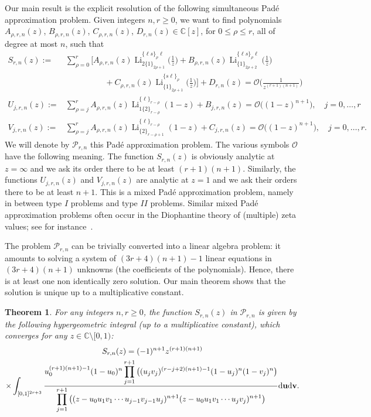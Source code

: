 \documentclass[reqno,12pt]{amsart}
\numberwithin{equation}{section}
\newtheorem{theo}{Theorem}
\theoremstyle{remark}
\def\li{\operatorname{Li}}
\def\dd{\textup{d}}
\begin{document}
 
Our main result is the explicit resolution of the following simultaneous Pad\'e approximation problem. 
Given   integers $n,r\ge 0$, we want to find 
polynomials $A_{\rho,r,n}(z)$,  $B_{\rho,r,n}(z)$, $C_{\rho,r,n}(z)$, 
$D_{r,n}(z) \in \mathbb C[z]$, for $0\leq \rho \leq r$, all of degree at most $n$, such that
\begin{align*}
S_{r,n}(z):=&\sum_{\rho=0}^r \bigg[A_{\rho,r,n}(z) \li_{2\{1\}_{2\rho+1}}^{\{\ell s\}_\rho\ell}\Big(\frac1z\Big)
+B_{\rho,r,n}(z) \li_{\{1\}_{2\rho+2}}^{\{\ell s\}_\rho\ell}\Big(\frac1z\Big)
\\
&\hspace{2cm} +C_{\rho,r,n}(z) \li_{\{1\}_{2\rho+1}}^{\{s\ell\}_\rho}\Big(\frac1z\Big)\bigg]+D_{r,n}(z)
= \mathcal{O}\Big(\frac1{z^{(r+1)(n+1)}}\Big)
\\
U_{j,r,n}(z):=&\sum_{\rho=j}^r A_{\rho,r,n}(z) \li_{1\{2\}_{r-\rho}}^{\{\ell\}_{r-\rho}}(1-z) 
+ B_{j,r,n}(z) = \mathcal{O}\big((1-z)^{n+1}\big), 
\quad j=0, \ldots, r
\\
V_{j,r,n}(z):=&\sum_{\rho=j}^r A_{\rho,r,n}(z) \li_{\{2\}_{r-\rho+1}}^{\{\ell\}_{r-\rho}}(1-z) 
+ C_{j,r,n}(z) = \mathcal{O}\big((1-z)^{n+1}\big), \quad j=0, \ldots, r.
\end{align*} 
We will denote by $\mathcal{P}_{r,n}$ this Pad\'e approximation  problem. The various symbols 
$\mathcal{O}$ have the following 
meaning. The function $S_{r,n}(z)$ is obviously analytic at $z=\infty$ and we ask   its order there to  be at 
least $(r+1)(n+1)$. Similarly, the functions $U_{j,r,n}(z)$ and $V_{j,r,n}(z)$ are analytic at $z=1$ and we ask 
  their orders there to be at least $n+1$. This is a mixed  Pad\'e approximation problem, 
namely in between type $I$ problems and 
type $II$ problems. 
  Similar mixed Pad\'e approximation problems often occur in the Diophantine theory of (multiple) 
zeta values; see for instance~\cite{firi, sorokin2, sorokin1}.

\medskip

The problem $\mathcal{P}_{r,n}$ can be trivially converted into a linear algebra problem: it amounts to solving a 
system of $(3r+4)(n+1)-1$ linear equations in  $(3r+4)(n+1)$ unknowns (the coefficients 
of the polynomials). Hence, there is at least one non identically zero solution. 
Our main theorem shows that the solution is unique up to a multiplicative constant.

\medskip

\begin{theo}\label{theo:1} For any integers $n,r\ge 0$, 
the function $S_{r,n}(z)$ in $\mathcal{P}_{r,n}$ is given by the following  
hypergeometric integral (up to a multiplicative constant), which converges for any 
$z\in \mathbb C\setminus[0,1)$:
\begin{multline}\label{eq:intro6}
S_{r,n}(z)=(-1)^{n+1}z^{(r+1)(n+1)}
\\
\times \int_{[0,1]^{2r+3}} 
\frac{\displaystyle u_0^{(r+1)(n+1)-1}(1-u_0)^n 
\prod_{j=1}^{r+1}\big((u_jv_j)^{(r-j+2)(n+1)-1}(1-u_j)^n(1-v_j)^n\big)}
{\displaystyle \prod_{j=1}^{r+1}\big((z-u_0u_1v_1\cdots u_{j-1}v_{j-1}u_j)^{n+1}
(z-u_0u_1v_1\cdots u_{j}v_{j})^{n+1}\big)} \dd{\bf u}\dd{\bf v}.
\end{multline}
\end{theo}
\end{document}
